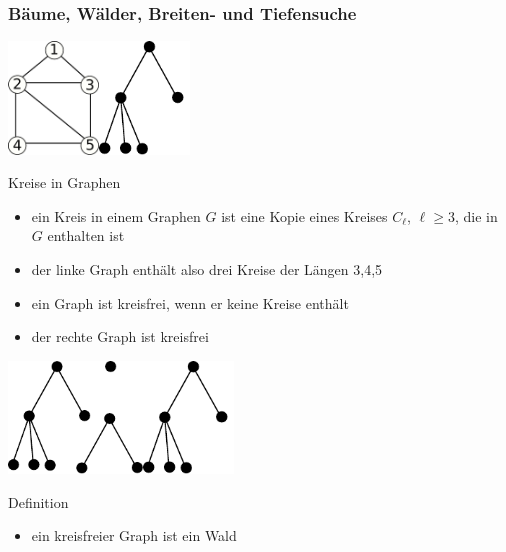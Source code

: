\documentclass[aspectratio=1610, 11pt]{beamer}
\newcommand{\mytitle}{B\"aume, W\"alder, Breiten- und Tiefensuche}
\begin{document}
\begin{frame}\frametitle{\mytitle}
	\begin{overprint}
		\includegraphics[height=30mm]{images/house.pdf}\hfill\includegraphics[height=30mm]{images/tree1.pdf}
		\begin{exampleblock}{Kreise in Graphen}
			\begin{itemize}
				\item ein \alert{Kreis} in einem Graphen $G$ ist eine Kopie eines Kreises $C_\ell$, $\ell\geq3$, die in $G$ enthalten ist
				\item der linke Graph enth\"alt also drei Kreise der L\"angen 3,4,5
				\item ein Graph ist \alert{kreisfrei}, wenn er keine Kreise enth\"alt
				\item der rechte Graph ist kreisfrei
			\end{itemize}
		\end{exampleblock}
		\includegraphics[height=30mm]{images/forest.pdf}\hfill\includegraphics[height=30mm]{images/tree1.pdf}
		\begin{block}{Definition}
			\begin{itemize}
				\item ein kreisfreier Graph ist ein \alert{Wald}

\end{itemize}
\end{block}
\end{overprint}
\end{frame}
\end{document}
